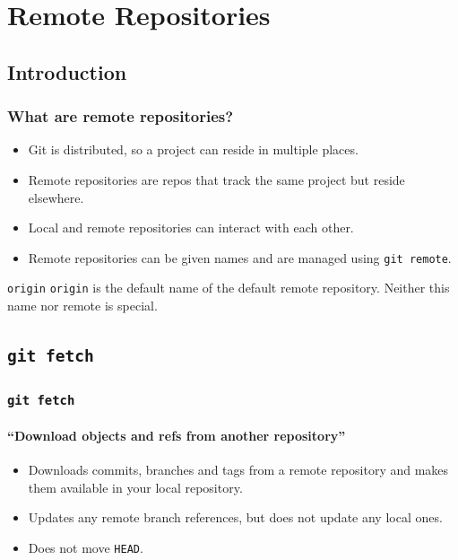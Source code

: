 \documentclass{beamer}
\newcommand\gitcmd[1]{\texttt{git #1}}
\newcommand\gHEAD{\texttt{HEAD}}
\newcommand\gremote[1]{\texttt{#1}}
\begin{document}
\section{Remote Repositories}
\subsection{Introduction}

\begin{frame}
  \frametitle{What are remote repositories?}
  \begin{itemize}
    \item Git is distributed, so a project can reside in multiple places.
    \item Remote repositories are repos that track the same project but reside elsewhere.
    \item Local and remote repositories can interact with each other.
    \item Remote repositories can be given names and are managed using \gitcmd{remote}.
  \end{itemize}
  \vfill
  \begin{block}{\gremote{origin}}
    \gremote{origin} is the default name of the default remote repository. Neither this name nor remote is special.
  \end{block}
\end{frame}

\subsection{\gitcmd{fetch}}

\begin{frame}
  \frametitle{\gitcmd{fetch}}
  \framesubtitle{``Download objects and refs from another repository''}
  \begin{itemize}
    \item Downloads commits, branches and tags from a remote repository and makes them available in your local repository.
    \item Updates any remote branch references, but does not update any local ones.
    \item Does not move \gHEAD{}.
  \end{itemize}
\end{frame}
\end{document}
